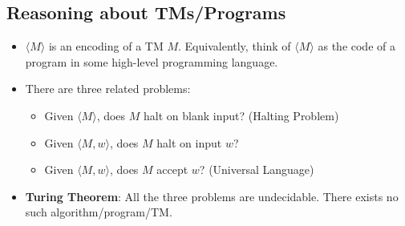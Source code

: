 \documentclass[12pt]{article}
\begin{document}
\subsection{Reasoning about TMs/Programs}
\begin{itemize}
    \item $\langle M \rangle$ is an encoding of a TM $M$. Equivalently, think of $\langle M \rangle$ as the code of a program in some high-level programming language.
    \item There are three related problems:
    \begin{itemize}
        \item Given $\langle M \rangle$, does $M$ halt on blank input? (Halting Problem)
        \item Given $\langle M, w \rangle$, does $M$ halt on input $w$?
        \item Given $\langle M, w \rangle$, does $M$ accept $w$? (Universal Language)
    \end{itemize}
    \item \textbf{Turing Theorem}: All the three problems are undecidable. There exists no such algorithm/program/TM.
\end{itemize}
\end{document}
